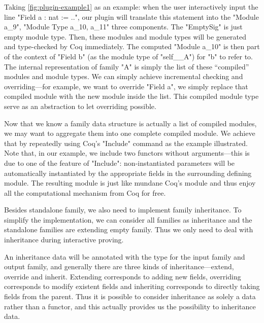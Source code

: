 Taking \cref{fig:plugin-example1} as an example: when the user interactively input the line "Field a : nat := ..", our plugin will translate this statement into the "Module a_9", "Module Type a_10, a_11" three components. {The "EmptySig" is just empty module type.} Then, these modules and module types will be generated and type-checked by Coq immediately. The computed "Module a_10" is then part of the context of "Field b" (as the module type of "self__A") for "b" to refer to. The internal representation of family "A" is simply the list of these ``compiled'' modules and module types. We can simply achieve incremental checking and overriding---for example, we want to override "Field a", we simply replace that compiled module with the new module inside the list. This compiled module type serve as an abstraction to let overriding possible.

Now that we know a family data structure is actually a list of compiled modules, we may want to aggregate them into one complete compiled module. We achieve that by repeatedly using Coq's "Include" command as the example illustrated. Note that, in our example, we include two functors without arguments---this is due to one of the feature of "Include": non-instantiated parameters will be automatically instantiated by the appropriate fields in the surrounding defining module. The resulting module is just like mundane Coq's module and thus enjoy all the computational mechanism from Coq for free. 



Besides standalone family, we also need to implement family inheritance. To simplify the implementation, we can consider all families as inheritance and the standalone families are extending empty family. Thus we only need to deal with inheritance during interactive proving. 

An inheritance data will be annotated with the type for the input family and output family, and generally there are three kinds of inheritance---extend, override and inherit. Extending corresponds to adding new fields, overriding corresponds to modify existent fields and inheriting corresponds to directly taking fields from the parent. Thus it is possible to consider inheritance as solely a data rather than a functor, and this actually provides us the possibility to  inheritance data. 




